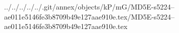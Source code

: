 ../../../../../.git/annex/objects/kP/mG/MD5E-s5224--ae011e5146fe3b8709b49e127aae910e.tex/MD5E-s5224--ae011e5146fe3b8709b49e127aae910e.tex